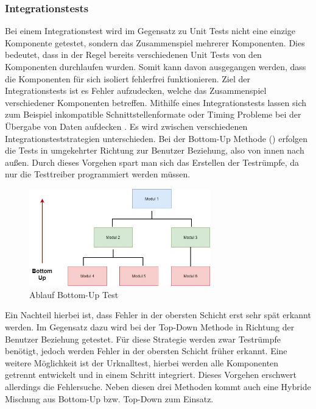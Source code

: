 \subsubsection{Integrationstests}
Bei einem Integrationstest wird im Gegensatz zu Unit Tests nicht eine einzige Komponente getestet, sondern das Zusammenspiel mehrerer Komponenten. Dies bedeutet, dass in der Regel bereits verschiedenen Unit Tests von den Komponenten durchlaufen wurden. Somit kann davon ausgegangen werden, dass die Komponenten für sich isoliert fehlerfrei funktionieren. Ziel der Integrationstests ist es Fehler aufzudecken, welche das Zusammenspiel verschiedener Komponenten betreffen. Mithilfe eines Integrationstests lassen sich zum Beispiel inkompatible Schnittstellenformate oder Timing Probleme bei der Übergabe von Daten aufdecken \cite{Witte.2016}. Es wird zwischen verschiedenen Integrationsteststrategien unterschieden. Bei der Bottom-Up Methode (\dq {}\dq) erfolgen die Tests in umgekehrter Richtung zur Benutzer Beziehung, also von  innen nach außen. Durch dieses Vorgehen spart man sich das Erstellen der Testrümpfe, da nur die Testtreiber programmiert werden müssen.
\begin{figure}[h]
  \centering
   \includegraphics[width=0.70\textwidth]{img/Bottom_UP.jpg} 
   \caption{ Ablauf Bottom-Up Test}
   \label{fig:Bottom_UP.jpg}
\end{figure}
 Ein Nachteil hierbei ist, dass Fehler in der obersten Schicht erst sehr spät erkannt werden. Im Gegensatz dazu wird bei der Top-Down Methode in Richtung der Benutzer Beziehung getestet. Für diese Strategie werden zwar Testrümpfe benötigt, jedoch werden Fehler in der obersten Schicht früher erkannt. Eine weitere Möglichkeit ist der Urknalltest, hierbei werden alle Komponenten getrennt entwickelt und in einem Schritt integriert. Dieses Vorgehen erschwert allerdings die Fehlersuche. Neben diesen drei Methoden kommt auch eine Hybride Mischung aus Bottom-Up bzw. Top-Down zum Einsatz.  

